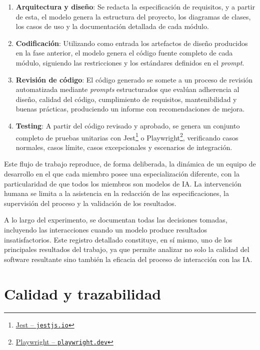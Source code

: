 \begin{enumerate}
  \item \textbf{Arquitectura y diseño}: Se redacta la especificación de requisitos, y a partir de esta, el modelo genera la estructura del proyecto, los diagramas de clases, los casos de uso y la documentación detallada de cada módulo.

  \item \textbf{Codificación}: Utilizando como entrada los artefactos de diseño producidos en la fase anterior, el modelo genera el código fuente completo de cada módulo, siguiendo las restricciones y los estándares definidos en el \textit{prompt}.

  \item \textbf{Revisión de código}: El código generado se somete a un proceso de revisión automatizada mediante \textit{prompts} estructurados que evalúan adherencia al diseño, calidad del código, cumplimiento de requisitos, mantenibilidad y buenas prácticas, produciendo un informe con recomendaciones de mejora.

  \item \textbf{Testing}: A partir del código revisado y aprobado, se genera un conjunto completo de pruebas unitarias con Jest\footnote{\href{https://jestjs.io}{Jest -- \texttt{jestjs.io}}} o Playwright\footnote{\href{https://playwright.dev}{Playwright -- \texttt{playwright.dev}}}, verificando casos normales, casos límite, casos excepcionales y escenarios de integración.\\
\end{enumerate}

Este flujo de trabajo reproduce, de forma deliberada, la dinámica de un equipo de desarrollo en el que cada miembro posee una especialización diferente, con la particularidad de que todos los miembros son modelos de \ac{IA}. La intervención humana se limita a la asistencia en la redacción de las especificaciones, la supervisión del proceso y la validación de los resultados. 

A lo largo del experimento, se documentan todas las decisiones tomadas, incluyendo las interacciones cuando un modelo produce resultados insatisfactorios. Este registro detallado constituye, en sí mismo, uno de los principales resultados del trabajo, ya que permite analizar no solo la calidad del software resultante sino también la eficacia del proceso de interacción con las \ac{IA}.

\section{Calidad y trazabilidad} \label{sec:calidad}

